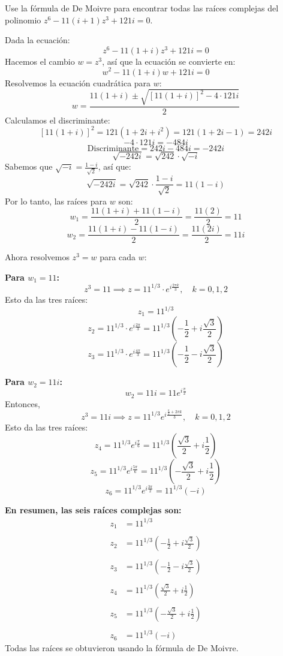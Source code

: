 \begin{prob}Use la fórmula de De Moivre para encontrar todas las raíces complejas del polinomio $z^6-11(i+1)z^3+121i=0$.
\begin{myproof}
Dada la ecuación:
\[
z^6 - 11(1+i)z^3 + 121i = 0
\]
Hacemos el cambio $w = z^3$, así que la ecuación se convierte en:
\[
w^2 - 11(1+i)w + 121i = 0
\]
Resolvemos la ecuación cuadrática para $w$:
\[
w = \frac{11(1+i) \pm \sqrt{[11(1+i)]^2 - 4 \cdot 121i}}{2}
\]
Calculamos el discriminante:
\[
[11(1+i)]^2 = 121(1 + 2i + i^2) = 121(1 + 2i - 1) = 242i
\]
\[
-4 \cdot 121i = -484i
\]
\[
\text{Discriminante} = 242i - 484i = -242i
\]
\[
\sqrt{-242i} = \sqrt{242} \cdot \sqrt{-i}
\]
Sabemos que $\sqrt{-i} = \frac{1-i}{\sqrt{2}}$, así que:
\[
\sqrt{-242i} = \sqrt{242} \cdot \frac{1-i}{\sqrt{2}} = 11(1-i)
\]
Por lo tanto, las raíces para $w$ son:
\[
w_1 = \frac{11(1+i) + 11(1-i)}{2} = \frac{11(2)}{2} = 11
\]
\[
w_2 = \frac{11(1+i) - 11(1-i)}{2} = \frac{11(2i)}{2} = 11i
\]

Ahora resolvemos $z^3 = w$ para cada $w$:

\textbf{Para $w_1 = 11$:}
\[
z^3 = 11 \implies z = 11^{1/3} \cdot e^{i\frac{2\pi k}{3}}, \quad k=0,1,2
\]
Esto da las tres raíces:
\[
z_1 = 11^{1/3}
\]
\[
z_2 = 11^{1/3} \cdot e^{i\frac{2\pi}{3}} = 11^{1/3} \left(-\frac{1}{2} + i\frac{\sqrt{3}}{2}\right)
\]
\[
z_3 = 11^{1/3} \cdot e^{i\frac{4\pi}{3}} = 11^{1/3} \left(-\frac{1}{2} - i\frac{\sqrt{3}}{2}\right)
\]

\textbf{Para $w_2 = 11i$:}
\[
w_2 = 11i = 11 e^{i\frac{\pi}{2}}
\]
Entonces,
\[
z^3 = 11i \implies z = 11^{1/3} e^{i\frac{\frac{\pi}{2} + 2\pi k}{3}}, \quad k=0,1,2
\]
Esto da las tres raíces:
\[
z_4 = 11^{1/3} e^{i\frac{\pi}{6}} = 11^{1/3} \left(\frac{\sqrt{3}}{2} + i\frac{1}{2}\right)
\]
\[
z_5 = 11^{1/3} e^{i\frac{5\pi}{6}} = 11^{1/3} \left(-\frac{\sqrt{3}}{2} + i\frac{1}{2}\right)
\]
\[
z_6 = 11^{1/3} e^{i\frac{3\pi}{2}} = 11^{1/3} (-i)
\]

\textbf{En resumen, las seis raíces complejas son:}
\[
\boxed{
\begin{aligned}
z_1 &= 11^{1/3} \\\\
z_2 &= 11^{1/3} \left(-\frac{1}{2} + i\frac{\sqrt{3}}{2}\right) \\\\
z_3 &= 11^{1/3} \left(-\frac{1}{2} - i\frac{\sqrt{3}}{2}\right) \\\\
z_4 &= 11^{1/3} \left(\frac{\sqrt{3}}{2} + i\frac{1}{2}\right) \\\\
z_5 &= 11^{1/3} \left(-\frac{\sqrt{3}}{2} + i\frac{1}{2}\right) \\\\
z_6 &= 11^{1/3} (-i)
\end{aligned}
}
\]
Todas las raíces se obtuvieron usando la fórmula de De Moivre.
\end{myproof}
\end{prob}

